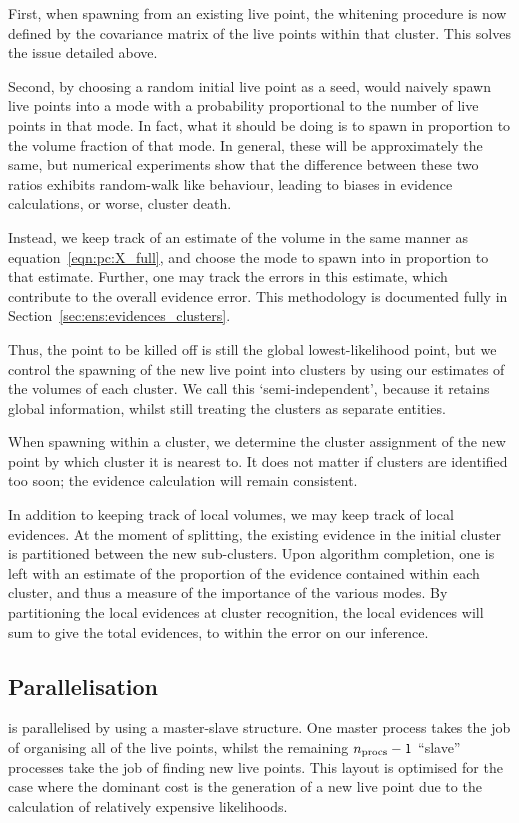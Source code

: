 First, when spawning from an existing live point, the whitening procedure is now defined by the covariance matrix of the live points within that cluster. This solves the issue detailed above.

Second, by choosing a random initial live point as a seed, \PolyChord{} would naively spawn live points into a mode with a probability proportional to the number of live points in that mode. In fact, what it should be doing is to spawn in proportion to the volume fraction of that mode. In general, these will be approximately the same, but numerical experiments show that the difference between these two ratios exhibits random-walk like behaviour, leading to biases in evidence calculations, or worse, cluster death. 

Instead, we keep track of an estimate of the volume in the same manner as equation~\eqref{eqn:pc:X_full}, and choose the mode to spawn into in proportion to that estimate. Further, one may track the errors in this estimate, which contribute to the overall evidence error. This methodology is documented fully in Section~\ref{sec:ens:evidences_clusters}.

Thus, the point to be killed off is still the global lowest-likelihood point, but we control the spawning of the new live point into clusters by using our estimates of the volumes of each cluster. We call this `semi-independent', because it retains global information, whilst still treating the clusters as separate entities. 

When spawning within a cluster, we determine the cluster assignment of the new point by which cluster it is nearest to. It does not matter if clusters are identified too soon; the evidence calculation will remain consistent.

In addition to keeping track of local volumes, we may keep track of local evidences. At the moment of splitting, the existing evidence in the initial cluster is partitioned between the new sub-clusters. Upon algorithm completion, one is left with an estimate of the proportion of the evidence contained within each cluster, and thus a measure of the importance of the various modes. By partitioning the local evidences at cluster recognition, the local evidences will sum to give the total evidences, to within the error on our inference.


\subsection{Parallelisation}
\label{sec:pc:parallelisation}
\PolyChord{} is parallelised by \openMPI{} using a master-slave structure.  One master process takes the job of organising all of the live points, whilst the remaining ${n_{\mathrm{procs}}-1}$ ``slave'' processes take the job of finding new live points. This layout is optimised for the case where the dominant cost is the generation of a new live point due to the calculation of relatively expensive likelihoods.

